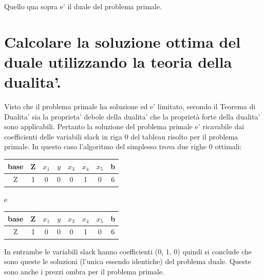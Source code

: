 \documentclass[a4paper,12pt,oneside]{article}
\begin{document}
    Quello qua sopra e' il duale del problema primale.
    \newpage
    \section{Calcolare la soluzione ottima del duale utilizzando la teoria della dualita'.}
    
    Visto che il problema primale ha soluzione ed e' limitato, secondo il Teorema di Dualita' sia la proprieta' debole della dualita' che la proprietà forte della dualita' sono applicabili.
    Pertanto la soluzione del problema primale e' ricavabile dai coefficienti delle variabili slack in riga 0 del tableau risolto per il problema primale.
    In questo caso l'algoritmo del simplesso trova due righe 0 ottimali:

    \begin{center}
        \begin{tabular}{||c c c c c c c c||}
            \hline
            base & Z & $x_1$ & $y$ & $x_3$ & $x_4$ & $x_5$ & b \\
            \hline
            \hline
            Z     & 1 & 0 & 0 & 0 &            1 &            0 &  6 \\
            \hline
        \end{tabular}
    \end{center}
    e
    \begin{center}
        \begin{tabular}{||c c c c c c c c||}
            \hline
            base & Z & $x_1$ & $y$ & $x_3$ & $x_4$ & $x_5$ & b \\
            \hline
            \hline
            Z     & 1 & 0 & 0 & 0 &            1 &            0 &  6 \\
            \hline
        \end{tabular}
    \end{center}

    In entrambe le variabili slack hanno coefficienti (0, 1, 0) quindi si conclude che sono queste le soluzioni (l'unica essendo identiche) del problema duale.
    Queste sono anche i prezzi ombra per il problema primale.
\end{document}
